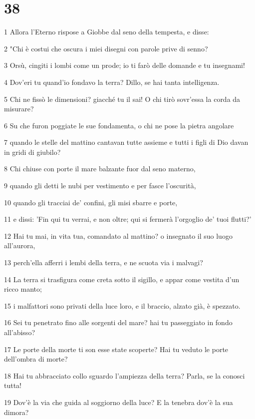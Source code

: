 \chapter{38}

\par 1 Allora l'Eterno rispose a Giobbe dal seno della tempesta, e disse:
\par 2 "Chi è costui che oscura i miei disegni con parole prive di senno?
\par 3 Orsù, cingiti i lombi come un prode; io ti farò delle domande e tu insegnami!
\par 4 Dov'eri tu quand'io fondavo la terra? Dillo, se hai tanta intelligenza.
\par 5 Chi ne fissò le dimensioni? giacché tu il sai! O chi tirò sovr'essa la corda da misurare?
\par 6 Su che furon poggiate le sue fondamenta, o chi ne pose la pietra angolare
\par 7 quando le stelle del mattino cantavan tutte assieme e tutti i figli di Dio davan in gridi di giubilo?
\par 8 Chi chiuse con porte il mare balzante fuor dal seno materno,
\par 9 quando gli detti le nubi per vestimento e per fasce l'oscurità,
\par 10 quando gli tracciai de' confini, gli misi sbarre e porte,
\par 11 e dissi: 'Fin qui tu verrai, e non oltre; qui si fermerà l'orgoglio de' tuoi flutti?'
\par 12 Hai tu mai, in vita tua, comandato al mattino? o insegnato il suo luogo all'aurora,
\par 13 perch'ella afferri i lembi della terra, e ne scuota via i malvagi?
\par 14 La terra si trasfigura come creta sotto il sigillo, e appar come vestita d'un ricco manto;
\par 15 i malfattori sono privati della luce loro, e il braccio, alzato già, è spezzato.
\par 16 Sei tu penetrato fino alle sorgenti del mare? hai tu passeggiato in fondo all'abisso?
\par 17 Le porte della morte ti son esse state scoperte? Hai tu veduto le porte dell'ombra di morte?
\par 18 Hai tu abbracciato collo sguardo l'ampiezza della terra? Parla, se la conosci tutta!
\par 19 Dov'è la via che guida al soggiorno della luce? E la tenebra dov'è la sua dimora?
